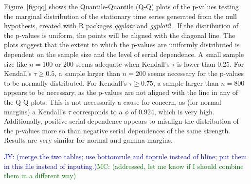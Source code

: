 \documentclass[12pt, titlepage, letterpaper]{article}
\newcommand{\jy}[1]{\textcolor{blue}{JY: (#1)}}
\newcommand{\mc}[1]{\textcolor{green}{MC: (#1)}}
\begin{document}
Figure~\ref{fig:qq} shows the Quantile-Quantile (Q-Q)
plots of the p-values testing the marginal distribution of the stationary time
series generated from the null hypothesis, created with R packages
\textsl{qqplotr} and \textsl{ggplot2} \citep{qqplotr, ggplot2}. If the
distribution of the p-values is uniform, the points will be aligned with the
diagonal line. The plots suggest that the extent to which the p-values are
uniformly distributed is dependent on the sample size and the level of serial 
dependence.
A small sample size like $n = 100$ or $200$ seems adequate when Kendall's
$\tau$ is lower than 0.25. For Kendall's $\tau \geq 0.5$, a sample larger than
$n = 200$ seems necessary for the p-values to be normally distributed. For
Kendall's $\tau \geq 0.75$, a sample larger than $n = 800$ appears to be 
necessary, as the p-values are not aligned with the line in any of the Q-Q 
plots. This
is not necessarily a cause for concern, as (for normal margins)
a Kendall's $\tau$ corresponds to
a $\phi$ of 0.924, which is very high.
Additionally, positive serial dependence appears to misalign the distribution
of the p-values more so than negative serial dependences of the same strength.
Results are very similar for normal and gamma margins.

\jy{merge the two tables; use bottomrule and toprule instead of hline;
  put them in this file instead of inputing.}\mc{addressed, let me know if I 
  should combine them in a different way}
  
\end{document}
